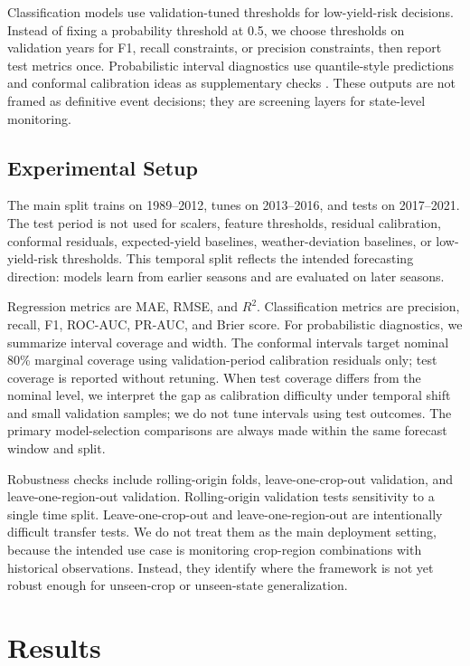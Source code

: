 \documentclass[wcp]{jmlr}
\DeclareRobustCommand{\Rsqdot}{\BeginAccSupp{method=hex,unicode,ActualText=005200B2002E}\ensuremath{R^2}.\EndAccSupp{}}
\begin{document}
Classification models use validation-tuned thresholds for low-yield-risk decisions. Instead of fixing a probability threshold at 0.5, we choose thresholds on validation years for F1, recall constraints, or precision constraints, then report test metrics once. Probabilistic interval diagnostics use quantile-style predictions and conformal calibration ideas as supplementary checks \citep{romano2019cqr,angelopoulos2023conformal}. These outputs are not framed as definitive event decisions; they are screening layers for state-level monitoring.

\subsection{Experimental Setup}

The main split trains on 1989--2012, tunes on 2013--2016, and tests on 2017--2021. The test period is not used for scalers, feature thresholds, residual calibration, conformal residuals, expected-yield baselines, weather-deviation baselines, or low-yield-risk thresholds. This temporal split reflects the intended forecasting direction: models learn from earlier seasons and are evaluated on later seasons.

Regression metrics are MAE, RMSE, and \Rsqdot{} Classification metrics are precision, recall, F1, ROC-AUC, PR-AUC, and Brier score. For probabilistic diagnostics, we summarize interval coverage and width. The conformal intervals target nominal 80\% marginal coverage using validation-period calibration residuals only; test coverage is reported without retuning. When test coverage differs from the nominal level, we interpret the gap as calibration difficulty under temporal shift and small validation samples; we do not tune intervals using test outcomes. The primary model-selection comparisons are always made within the same forecast window and split.

Robustness checks include rolling-origin folds, leave-one-crop-out validation, and leave-one-region-out validation. Rolling-origin validation tests sensitivity to a single time split. Leave-one-crop-out and leave-one-region-out are intentionally difficult transfer tests. We do not treat them as the main deployment setting, because the intended use case is monitoring crop-region combinations with historical observations. Instead, they identify where the framework is not yet robust enough for unseen-crop or unseen-state generalization.

\section{Results}
\end{document}
